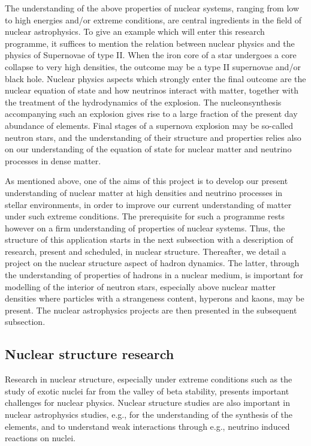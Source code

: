 The understanding of the above properties of nuclear systems,
ranging from low to high energies and/or extreme conditions,
are central ingredients in the field of nuclear astrophysics. 
To give an example which will enter this research programme,
it suffices to mention the relation between nuclear physics
and the physics of Supernovae of type II. 
When the iron core of a star undergoes a core collapse to very high
densities, the outcome may be a type II supernovae and/or black hole.
Nuclear physics aspects which strongly enter the final outcome
are the nuclear equation of state and how neutrinos interact with
matter, together with the treatment of the hydrodynamics of the
explosion. The nucleonsynthesis accompanying such an explosion
gives rise to a large fraction 
of the present day abundance of elements.
Final stages of a supernova explosion may be so-called neutron stars,
and the understanding of their structure and properties 
relies also on our understanding of the equation of state 
for nuclear matter and neutrino processes in dense matter.


As mentioned above, one of the aims of this project is to
develop our present understanding of nuclear matter
at high densities and neutrino processes in stellar environments,
in order to improve our current understanding of matter under
such extreme conditions.
The prerequisite for such a programme rests however on a firm understanding
of properties of nuclear systems.
Thus, the structure of this application starts in the next subsection
with a
description of research, present and scheduled, in nuclear structure.
Thereafter, we detail a project on the nuclear structure aspect
of hadron dynamics. The latter, through the understanding of properties
of hadrons in a nuclear medium, is important for modelling of the interior
of neutron stars, especially above nuclear matter densities where 
particles with a strangeness content, hyperons and kaons, may be present.
The nuclear astrophysics projects are then presented in the 
subsequent subsection. 



\subsection{Nuclear structure research}

Research in nuclear structure, especially under extreme conditions such 
as the study of exotic nuclei far from the 
valley of beta stability,  
presents important challenges for nuclear physics. Nuclear structure 
studies are also important  in nuclear 
astrophysics studies, e.g.,
for the understanding of the synthesis of the elements, and to understand 
weak interactions through e.g., neutrino induced reactions on nuclei.

